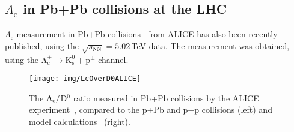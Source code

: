 % 

\subsection{$\Lambda_\mathrm{c}$ in Pb+Pb collisions at the LHC}

$\Lambda_\mathrm{c}$ measurement in Pb+Pb collisions~\cite{AlicePbPb} from ALICE has also been recently published, using the $\sqrt{s_\mathrm{NN}} = 5.02\,$TeV data. The measurement was obtained, using the $\mathrm{\Lambda_c^\pm \rightarrow K^0_s + p^\pm}$ channel.

\begin{figure}[!htb]
\centering
\texttt{[image: img/LcOverD0ALICE]}
\caption[The $\Lambdac/$D$^0$ ratio measured in Pb+Pb collisions by the ALICE experiment, compared to the p+Pb and p+p collisions and model calculations.]{The $\Lambdac/$D$^0$ ratio measured in Pb+Pb collisions by the ALICE experiment~\cite{AlicePbPb}, compared to the p+Pb and p+p collisions (left) and model calculations~\cite{PlumariGreco, Catania, LcPPbModelShaoSong, ShaoSongPP,  ShaoSong} (right).}
\label{fig:LcD0ALICE}
\end{figure}

